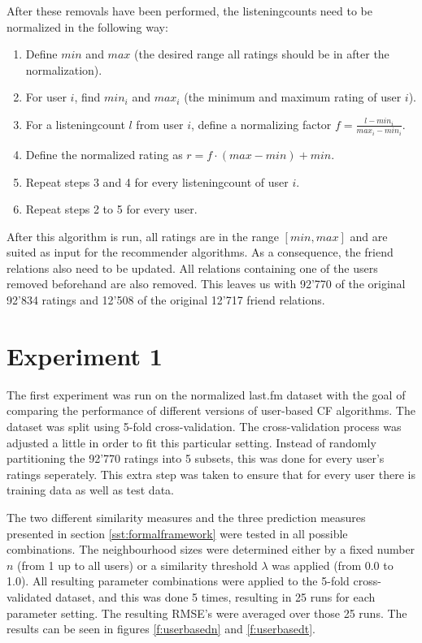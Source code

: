 After these removals have been performed, the listeningcounts need to be normalized in the following way:

\begin{enumerate}
\item Define $min$ and $max$ (the desired range all ratings should be in after the normalization).
\item For user $i$, find $min_i$ and $max_i$ (the minimum and maximum rating of user $i$).
\item For a listeningcount $l$ from user $i$, define a normalizing factor $f = \frac{l - min_i}{max_i - min_i}$.
\item Define the normalized rating as $r = f \cdot (max - min) + min$.
\item Repeat steps 3 and 4 for every listeningcount of user $i$.
\item Repeat steps 2 to 5 for every user.
\end{enumerate}

After this algorithm is run, all ratings are in the range $[min,max]$ and are suited as input for the recommender algorithms. As a consequence, the friend relations also need to be updated. All relations containing one of the users removed beforehand are also removed. This leaves us with 92'770 of the original 92'834 ratings and 12'508 of the original 12'717 friend relations.

\section{Experiment 1}
\label{st:experiment1} The first experiment was run on the normalized last.fm dataset with the goal of comparing the performance of different versions of user-based CF algorithms. The dataset was split using 5-fold cross-validation. The cross-validation process was adjusted a little in order to fit this particular setting. Instead of randomly partitioning the 92'770 ratings into 5 subsets, this was done for every user's ratings seperately. This extra step was taken to ensure that for every user there is training data as well as test data.

The two different similarity measures and the three prediction measures presented in section \ref{sst:formalframework} were tested in all possible combinations. The neighbourhood sizes were determined either by a fixed number $n$ (from 1 up to all users) or a similarity threshold $\lambda$ was applied (from 0.0 to 1.0). All resulting parameter combinations were applied to the 5-fold cross-validated dataset, and this was done 5 times, resulting in 25 runs for each parameter setting. The resulting RMSE's were averaged over those 25 runs. The results can be seen in figures \ref{f:userbasedn} and \ref{f:userbasedt}.

